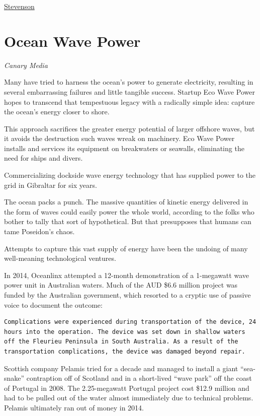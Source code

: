 \documentclass[
]{book}
\begin{document}
\href{https://physicsworld.com/a/sunny-superpower-solar-cells-close-in-on-50-efficiency/}{Stevenson}

\hypertarget{ocean-wave-power}{%
\chapter{Ocean Wave Power}\label{ocean-wave-power}}

\emph{Canary Media}

Many have tried to harness the ocean's power to generate electricity, resulting in several embarrassing failures and little tangible success. Startup Eco Wave Power hopes to transcend that tempestuous legacy with a radically simple idea: capture the ocean's energy closer to shore.

This approach sacrifices the greater energy potential of larger offshore waves, but it avoids the destruction such waves wreak on machinery. Eco Wave Power installs and services its equipment on breakwaters or seawalls, eliminating the need for ships and divers.

Commercializing dockside wave energy technology that has supplied power to the grid in Gibraltar for six years.

The ocean packs a punch. The massive quantities of kinetic energy delivered in the form of waves could easily power the whole world, according to the folks who bother to tally that sort of hypothetical. But that presupposes that humans can tame Poseidon's chaos.

Attempts to capture this vast supply of energy have been the undoing of many well-meaning technological ventures.

In 2014, Oceanlinx attempted a 12-month demonstration of a 1-megawatt wave power unit in Australian waters. Much of the AUD \$6.6 million project was funded by the Australian government, which resorted to a cryptic use of passive voice to document the outcome:

\begin{verbatim}
Complications were experienced during transportation of the device, 24 hours into the operation. The device was set down in shallow waters off the Fleurieu Peninsula in South Australia. As a result of the transportation complications, the device was damaged beyond repair.
\end{verbatim}

Scottish company Pelamis tried for a decade and managed to install a giant \hspace{0pt}``sea-snake'' contraption off of Scotland and in a short-lived \hspace{0pt}``wave park'' off the coast of Portugal in 2008. The 2.25-megawatt Portugal project cost \$12.9 million and had to be pulled out of the water almost immediately due to technical problems. Pelamis ultimately ran out of money in 2014.
\end{document}
